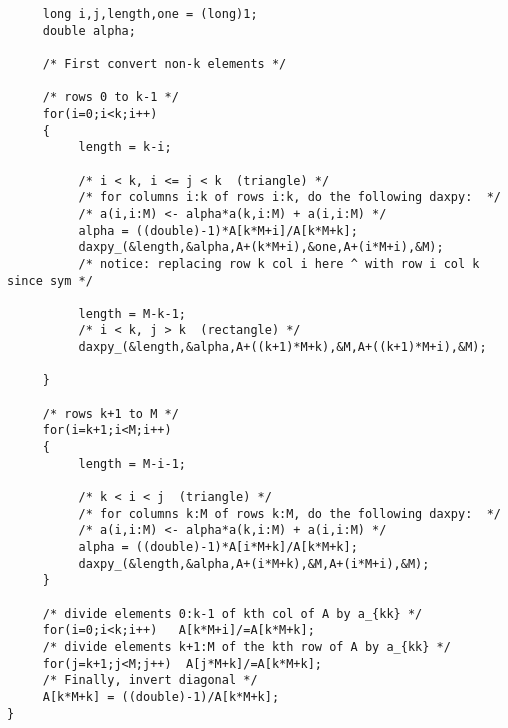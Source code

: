 \documentclass{article}
\begin{document}
{\begin{verbatim}
     long i,j,length,one = (long)1;
     double alpha;

     /* First convert non-k elements */

     /* rows 0 to k-1 */
     for(i=0;i<k;i++)
     {
          length = k-i;

          /* i < k, i <= j < k  (triangle) */
          /* for columns i:k of rows i:k, do the following daxpy:  */
          /* a(i,i:M) <- alpha*a(k,i:M) + a(i,i:M) */
          alpha = ((double)-1)*A[k*M+i]/A[k*M+k];
          daxpy_(&length,&alpha,A+(k*M+i),&one,A+(i*M+i),&M); 
          /* notice: replacing row k col i here ^ with row i col k since sym */

          length = M-k-1;
          /* i < k, j > k  (rectangle) */
          daxpy_(&length,&alpha,A+((k+1)*M+k),&M,A+((k+1)*M+i),&M); 

     }

     /* rows k+1 to M */
     for(i=k+1;i<M;i++)
     {
          length = M-i-1;
      
          /* k < i < j  (triangle) */
          /* for columns k:M of rows k:M, do the following daxpy:  */
          /* a(i,i:M) <- alpha*a(k,i:M) + a(i,i:M) */
          alpha = ((double)-1)*A[i*M+k]/A[k*M+k];
          daxpy_(&length,&alpha,A+(i*M+k),&M,A+(i*M+i),&M); 
     }

     /* divide elements 0:k-1 of kth col of A by a_{kk} */
     for(i=0;i<k;i++)   A[k*M+i]/=A[k*M+k];
     /* divide elements k+1:M of the kth row of A by a_{kk} */
     for(j=k+1;j<M;j++)  A[j*M+k]/=A[k*M+k];
     /* Finally, invert diagonal */
     A[k*M+k] = ((double)-1)/A[k*M+k];
}

\end{verbatim}
}
\end{document}
